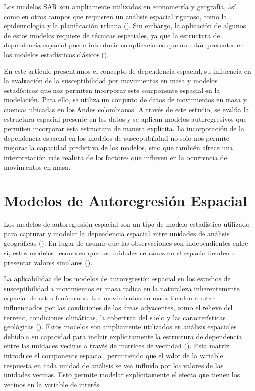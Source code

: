 \documentclass[
  manuscript=article,  
  layout=preprint,  
  year=2023,
  volume=0,
]{format}
\begin{document}
Los modelos SAR son ampliamente utilizados en econometría y geografía, así como en otros campos que requieren un análisis espacial riguroso, como la epidemiología y la planificación urbana (\cite{elhorst2022dynamic, rey2023geographic, jaya2021spatial, ver2018spatial}). Sin embargo, la aplicación de algunos de estos modelos requiere de técnicas especiales, ya que la estructura de dependencia espacial puede introducir complicaciones que no están presentes en los modelos estadísticos clásicos (\cite{anselin1990spatial}).

En este artículo presentamos el concepto de dependencia espacial, su influencia en la evaluación de la susceptibilidad por movimientos en masa y modelos estadísticos que nos permiten incorporar este componente espacial en la modelación. Para ello, se utiliza un conjunto de datos de movimientos en masa y cuencas ubicadas en los Andes colombianos. A través de este estudio, se evalúa la estructura espacial presente en los datos y se aplican modelos autoregresivos que permiten incorporar esta estructura de manera explícita. La incorporación de la dependencia espacial en los modelos de susceptibilidad no solo nos permite mejorar la capacidad predictiva de los modelos, sino que también ofrece una interpretación más realista de los factores que influyen en la ocurrencia de movimientos en masa.

\section{Modelos de Autoregresión Espacial}

Los modelos de autoregresión espacial son un tipo de modelo estadístico utilizado para capturar y modelar la dependencia espacial entre unidades de análisis geográficas (\cite{whittle1954stationary, getis2009spatial, stakhovych2009specification, ripley1988statistical}). En lugar de asumir que las observaciones son independientes entre sí, estos modelos reconocen que las unidades cercanas en el espacio tienden a presentar valores similares (\cite{anselin1988spatial}). 

La aplicabilidad de los modelos de autoregresión espacial en los estudios de susceptibilidad a movimientos en masa radica en la naturaleza inherentemente espacial de estos fenómenos. Los movimientos en masa tienden a estar influenciados por las condiciones de las áreas adyacentes, como el relieve del terreno, condiciones climáticas, la cobertura del suelo y las características geológicas (\cite{samia2019dynamic}). Estos modelos son ampliamente utilizados en análisis espaciales debido a su capacidad para incluir explícitamente la estructura de dependencia entre las unidades vecinas a través de matrices de vecindad (\cite{lesage2011pitfalls, kelejian2007relative}). Esta matriz introduce el componente espacial, permitiendo que el valor de la variable respuesta en cada unidad de análisis se vea influido por los valores de las unidades vecinas. Esto permite modelar explícitamente el efecto que tienen los vecinos en la variable de interés.
\end{document}
